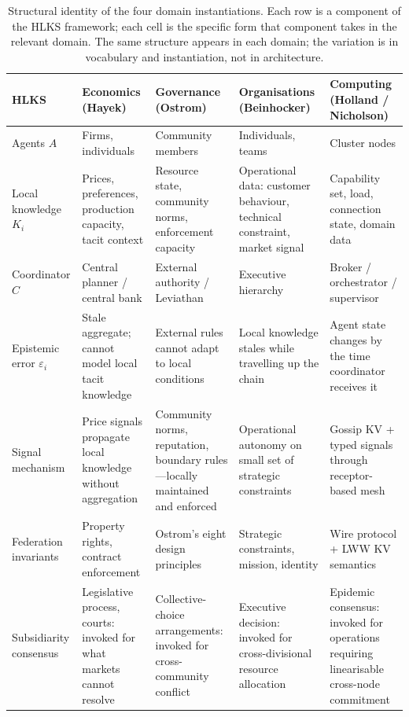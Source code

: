 \documentclass[11pt]{article}
\theoremstyle{definition}
\theoremstyle{plain}
\theoremstyle{plain}
\begin{document}
\begin{table}[H]
\centering
\small
\begin{tabularx}{\textwidth}{lXXXX}
\toprule
\textbf{HLKS} &
\textbf{Economics} (Hayek) &
\textbf{Governance} (Ostrom) &
\textbf{Organisations} (Beinhocker) &
\textbf{Computing} (Holland / Nicholson) \\
\midrule
Agents $A$ &
Firms, individuals &
Community members &
Individuals, teams &
Cluster nodes \\
\addlinespace
Local knowledge $K_i$ &
Prices, preferences, production capacity, tacit context &
Resource state, community norms, enforcement capacity &
Operational data: customer behaviour, technical constraint, market signal &
Capability set, load, connection state, domain data \\
\addlinespace
Coordinator $C$ &
Central planner / central bank &
External authority / Leviathan &
Executive hierarchy &
Broker / orchestrator / supervisor \\
\addlinespace
Epistemic error $\varepsilon_i$ &
Stale aggregate; cannot model local tacit knowledge &
External rules cannot adapt to local conditions &
Local knowledge stales while travelling up the chain &
Agent state changes by the time coordinator receives it \\
\addlinespace
Signal mechanism &
Price signals propagate local knowledge without aggregation &
Community norms, reputation, boundary rules---locally maintained and enforced &
Operational autonomy on small set of strategic constraints &
Gossip KV + typed signals through receptor-based mesh \\
\addlinespace
Federation invariants &
Property rights, contract enforcement &
Ostrom's eight design principles &
Strategic constraints, mission, identity &
Wire protocol + LWW KV semantics \\
\addlinespace
Subsidiarity consensus &
Legislative process, courts: invoked for what markets cannot resolve &
Collective-choice arrangements: invoked for cross-community conflict &
Executive decision: invoked for cross-divisional resource allocation &
Epidemic consensus: invoked for operations requiring linearisable cross-node commitment \\
\bottomrule
\end{tabularx}
\caption{Structural identity of the four domain instantiations. Each row is a
component of the HLKS framework; each cell is the specific form that
component takes in the relevant domain. The same structure appears in each
domain; the variation is in vocabulary and instantiation, not in
architecture.}
\label{tab:identity}
\end{table}
\end{document}
